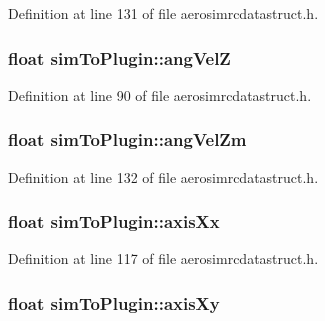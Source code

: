 \-Definition at line 131 of file aerosimrcdatastruct.\-h.

\hypertarget{group___aero_sim_r_c_gaaabca3226ef304ba1333129c54a8c777}{
\subsubsection[{ang\-Vel\-Z}]{\setlength{\rightskip}{0pt plus 5cm}float {\bf sim\-To\-Plugin\-::ang\-Vel\-Z}}}\label{group___aero_sim_r_c_gaaabca3226ef304ba1333129c54a8c777}


\-Definition at line 90 of file aerosimrcdatastruct.\-h.

\hypertarget{group___aero_sim_r_c_ga4387cb264fd400cd98815e6145b8114c}{
\subsubsection[{ang\-Vel\-Zm}]{\setlength{\rightskip}{0pt plus 5cm}float {\bf sim\-To\-Plugin\-::ang\-Vel\-Zm}}}\label{group___aero_sim_r_c_ga4387cb264fd400cd98815e6145b8114c}


\-Definition at line 132 of file aerosimrcdatastruct.\-h.

\hypertarget{group___aero_sim_r_c_ga693a3fedba573cb60ae2ced78f2f55e8}{
\subsubsection[{axis\-Xx}]{\setlength{\rightskip}{0pt plus 5cm}float {\bf sim\-To\-Plugin\-::axis\-Xx}}}\label{group___aero_sim_r_c_ga693a3fedba573cb60ae2ced78f2f55e8}


\-Definition at line 117 of file aerosimrcdatastruct.\-h.

\hypertarget{group___aero_sim_r_c_gaf149495ae6cb0a4b55f124b645e0cc8d}{
\subsubsection[{axis\-Xy}]{\setlength{\rightskip}{0pt plus 5cm}float {\bf sim\-To\-Plugin\-::axis\-Xy}}}\label{group___aero_sim_r_c_gaf149495ae6cb0a4b55f124b645e0cc8d}


